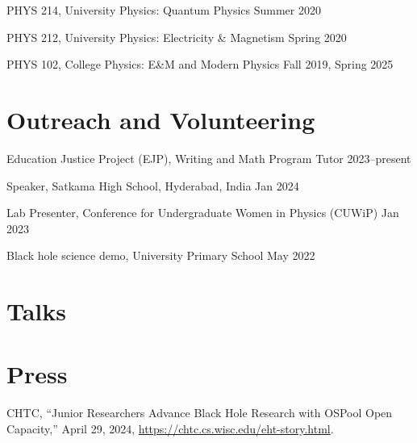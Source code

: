 \documentclass[11pt]{article}
\begin{document}
PHYS 214, University Physics: Quantum Physics \hfill Summer 2020

PHYS 212, University Physics: Electricity \& Magnetism \hfill Spring 2020\\

PHYS 102, College Physics: E\&M and Modern Physics \hfill Fall 2019, Spring 2025\\

\section*{Outreach and Volunteering}
Education Justice Project (EJP), Writing and Math Program Tutor \hfill 2023--present\\

Speaker, Satkama High School, Hyderabad, India \hfill Jan 2024\\

Lab Presenter, Conference for Undergraduate Women in Physics (CUWiP) \hfill Jan 2023\\

Black hole science demo, University Primary School \hfill May 2022\\


\ifdefined\withtalks{}
\section*{Talks}

\else\fi

\ifdefined\withpress{}
\section*{Press}
CHTC, “Junior Researchers Advance Black Hole Research with OSPool Open Capacity,” April 29, 2024, \href{https://chtc.cs.wisc.edu/eht-story.html}{https://chtc.cs.wisc.edu/eht-story.html}.
\end{document}
